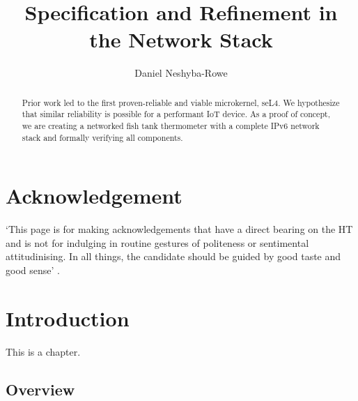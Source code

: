 \documentclass[twoside]{memoir}
\title{Specification and Refinement in the Network Stack} %
\author{Daniel Neshyba-Rowe}
\begin{document}
\frontmatter


\maketitle

\chapter{Acknowledgement}
`This page is for making acknowledgements that have a direct bearing on the HT and is not for indulging in routine gestures of politeness or sentimental attitudinising. In all things, the candidate should be guided by good taste and good sense' . %

\begin{abstract}
        Prior work led to the first proven-reliable and viable microkernel, seL4.
      We hypothesize that similar reliability is possible for a performant IoT device.
      As a proof of concept, we are creating a networked fish tank thermometer
      with a complete IPv6 network stack and formally verifying all components.

\end{abstract}

\tableofcontents


\mainmatter

\chapter{Introduction}

This is a chapter.

\section{Overview}
\end{document}
